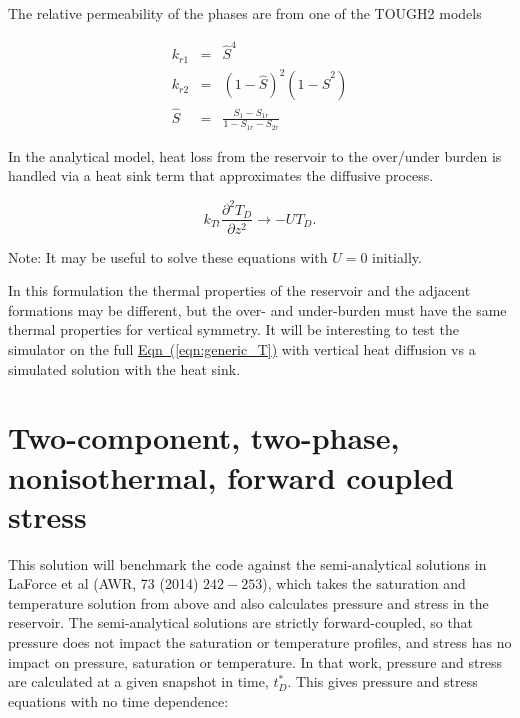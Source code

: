 \documentclass[12pt]{report}
\begin{document}
The relative permeability of the phases are from one of the TOUGH2 models


\begin{eqnarray}
k_{r1} &=& \hat{S}^4 \nonumber\\
k_{r2} &=& \left(1-\hat{S}\right)^2 \left(1-\hat{S}^2\right)\\
\hat{S} &=& \frac{S_1-S_{1r}}{1-S_{1r}-S_{2r}}\nonumber
\end{eqnarray}

In the analytical model, heat loss from the reservoir to the over/under burden is handled via a heat sink term that approximates the diffusive process.

\begin{equation}
k_{Tt}\frac{\partial^2 T_D}{\partial z^2} \to -U T_D.
\end{equation}

\noindent Note: It may be useful to solve these equations with $U=0$ initially.



%

In this formulation the thermal properties of the reservoir and the
adjacent formations may be different, but the over- and under-burden
must have the same thermal properties for vertical symmetry.  It will
be interesting to test the simulator on the full
\hyperref[eqn:generic_T]{Eqn~(\ref*{eqn:generic_T})} with vertical
heat diffusion vs a simulated solution with the heat sink.


\section{Two-component, two-phase, nonisothermal, forward coupled stress}

This solution will benchmark the code against the semi-analytical solutions in LaForce et al (AWR, 73 (2014) $242 - 253$), which takes the saturation and temperature solution from above and also calculates pressure and stress in the reservoir.  The semi-analytical solutions are strictly forward-coupled, so that pressure does not impact the saturation or temperature profiles, and stress has no impact on pressure, saturation or temperature. In that work, pressure and stress are calculated at a given snapshot in time, $t_D^*$. This gives pressure and stress equations with no time dependence:
\end{document}
